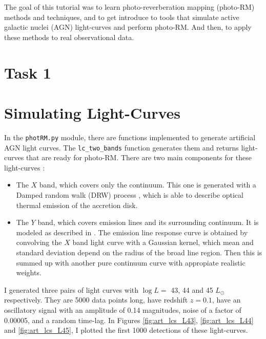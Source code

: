 \documentclass[letterpaper, oneside]{article}
\begin{document}
	
\templatePagecfg

The goal of this tutorial was to learn photo-reverberation mapping (photo-RM) methods and techniques, and to get introduce to tools that simulate active galactic nuclei (AGN) light-curves and perform photo-RM. And then, to apply these methods to real observational data.


\section*{Task 1}

\section{Simulating Light-Curves}

In the \texttt{photRM.py} module, there are functions implemented to generate artificial AGN light curves. The \texttt{lc\_two\_bands} function generates them and returns light-curves that are ready for photo-RM. There are two main components for these light-curves \cite{Kovacevic_2021, Kelly_2009}:
\begin{itemize}
	\item The $X$ band, which covers only the continuum. This one is generated with a Damped random walk (DRW) process %
	, which is able to describe optical thermal emission of the accretion disk.
	
	\item The $Y$ band, which covers emission lines and its surrounding continuum. It is modeled as described in \cite{Jankov_2022, Chelouche_Daniel_2012}. The emission line response curve is obtained by convolving the $X$ band light curve with a Gaussian kernel, which mean and standard deviation depend on the radius of the broad line region. Then this is summed up with another pure continuum curve with appropiate realistic weights.
\end{itemize}

I generated three pairs of light curves with $\log L = $ 43, 44 and 45 $L_{\odot}$ respectively. They are 5000 data points long, have redshift $z = 0.1$, have an oscillatory signal with an amplitude of 0.14 magnitudes, noise of a factor of 0.00005, and a random time-lag. In Figures \ref{fig:art_lcs_L43}, \ref{fig:art_lcs_L44} and \ref{fig:art_lcs_L45}, I plotted the first 1000 detections of these light-curves.
\end{document}
